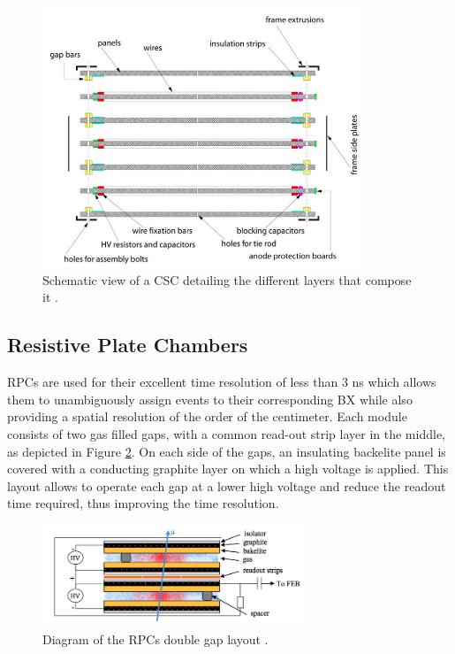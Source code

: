       \begin{figure}[b!]
        \centering
        \includegraphics[width=0.85\textwidth]{img/I-3-cms/csc.png}
        \caption{Schematic view of a CSC detailing the different layers that compose it \cite{1748-0221-3-08-S08004}.}
        \label{fig:I-3-csc}
      \end{figure}

  	\subsection{Resistive Plate Chambers}

      RPCs are used for their excellent time resolution of less than 3 ns which allows them to unambiguously assign events to their corresponding BX while also providing a spatial resolution of the order of the centimeter. Each module consists of two gas filled gaps, with a common read-out strip layer in the middle, as depicted in Figure \ref{fig:I-3-rpc}. On each side of the gaps, an insulating backelite panel is covered with a conducting graphite layer on which a high voltage is applied. This layout allows to operate each gap at a lower high voltage and reduce the readout time required, thus improving the time resolution. \\

      \begin{figure}[h!]
        \centering
        \includegraphics[width=0.7\textwidth]{img/I-3-cms/rpc.png}
        \caption{Diagram of the RPCs double gap layout \cite{1748-0221-3-08-S08004}.}
        \label{fig:I-3-rpc}
      \end{figure}

